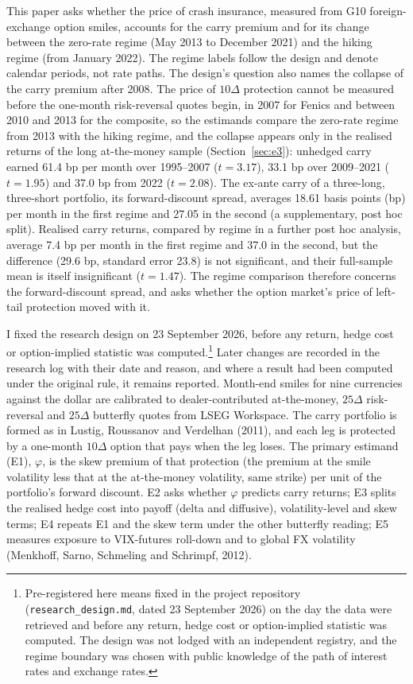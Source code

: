 \documentclass[11pt]{article}
\theoremstyle{result}
\newcommand{\D}{\Delta}
\begin{document}
This paper asks whether the price of crash insurance, measured from G10 foreign-exchange option smiles, accounts for the carry premium and for its change between the zero-rate regime (May 2013 to December 2021) and the hiking regime (from January 2022). The regime labels follow the design and denote calendar periods, not rate paths. The design's question also names the collapse of the carry premium after 2008. The price of $10\D$ protection cannot be measured before the one-month risk-reversal quotes begin, in 2007 for Fenics and between 2010 and 2013 for the composite, so the estimands compare the zero-rate regime from 2013 with the hiking regime, and the collapse appears only in the realised returns of the long at-the-money sample (Section~\ref{sec:e3}): unhedged carry earned 61.4 bp per month over 1995--2007 ($t=3.17$), 33.1 bp over 2009--2021 ($t=1.95$) and 37.0 bp from 2022 ($t=2.08$). The ex-ante carry of a three-long, three-short portfolio, its forward-discount spread, averages 18.61 basis points (bp) per month in the first regime and 27.05 in the second (a supplementary, post hoc split). Realised carry returns, compared by regime in a further post hoc analysis, average 7.4 bp per month in the first regime and 37.0 in the second, but the difference (29.6 bp, standard error 23.8) is not significant, and their full-sample mean is itself insignificant ($t=1.47$). The regime comparison therefore concerns the forward-discount spread, and asks whether the option market's price of left-tail protection moved with it.

I fixed the research design on 23 September 2026, before any return, hedge cost or option-implied statistic was computed.\footnote{Pre-registered here means fixed in the project repository (\texttt{research\_design.md}, dated 23 September 2026) on the day the data were retrieved and before any return, hedge cost or option-implied statistic was computed. The design was not lodged with an independent registry, and the regime boundary was chosen with public knowledge of the path of interest rates and exchange rates.} Later changes are recorded in the research log with their date and reason, and where a result had been computed under the original rule, it remains reported. Month-end smiles for nine currencies against the dollar are calibrated to dealer-contributed at-the-money, $25\D$ risk-reversal and $25\D$ butterfly quotes from LSEG Workspace. The carry portfolio is formed as in Lustig, Roussanov and Verdelhan (2011), and each leg is protected by a one-month $10\D$ option that pays when the leg loses. The primary estimand (E1), $\varphi$, is the skew premium of that protection (the premium at the smile volatility less that at the at-the-money volatility, same strike) per unit of the portfolio's forward discount. E2 asks whether $\varphi$ predicts carry returns; E3 splits the realised hedge cost into payoff (delta and diffusive), volatility-level and skew terms; E4 repeats E1 and the skew term under the other butterfly reading; E5 measures exposure to VIX-futures roll-down and to global FX volatility (Menkhoff, Sarno, Schmeling and Schrimpf, 2012).
\end{document}
